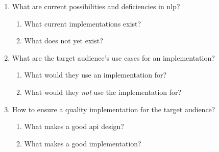 \begin{enumerate}
\item
  What are current possibilities and deficiencies in \gls{nlp}?
  \begin{enumerate}
    \item What current implementations exist?
    \item What does not yet exist?
  \end{enumerate}
\item
  What are the target audience's use cases for an implementation?
  \begin{enumerate}
    \item What would they use an implementation for?
    \item What would they \emph{not} use the implementation for?
  \end{enumerate}
\item
  How to ensure a quality implementation for the target audience?
  \begin{enumerate}
    \item What makes a good \gls{api} design?
    \item What makes a good implementation?
  \end{enumerate}
\end{enumerate}
